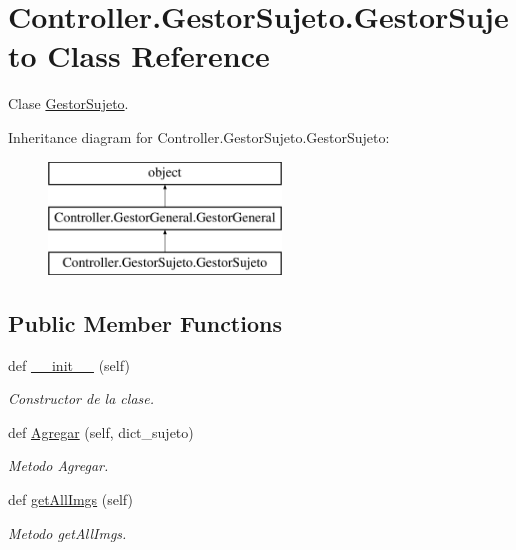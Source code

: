 \hypertarget{class_controller_1_1_gestor_sujeto_1_1_gestor_sujeto}{}\section{Controller.\+Gestor\+Sujeto.\+Gestor\+Sujeto Class Reference}
\label{class_controller_1_1_gestor_sujeto_1_1_gestor_sujeto}


Clase \hyperlink{class_controller_1_1_gestor_sujeto_1_1_gestor_sujeto}{Gestor\+Sujeto}.  


Inheritance diagram for Controller.\+Gestor\+Sujeto.\+Gestor\+Sujeto\+:\begin{figure}[H]
\begin{center}
\leavevmode
\includegraphics[height=3.000000cm]{class_controller_1_1_gestor_sujeto_1_1_gestor_sujeto}
\end{center}
\end{figure}
\subsection*{Public Member Functions}
\begin{DoxyCompactItemize}
\item 
def \hyperlink{class_controller_1_1_gestor_sujeto_1_1_gestor_sujeto_af03120d2a26ad27cf43979b059065818}{\+\_\+\+\_\+init\+\_\+\+\_\+} (self)
\begin{DoxyCompactList}\small\item\em Constructor de la clase. \end{DoxyCompactList}\item 
def \hyperlink{class_controller_1_1_gestor_sujeto_1_1_gestor_sujeto_a1c67d8cc16d790e739b12e48b150d05d}{Agregar} (self, dict\+\_\+sujeto)
\begin{DoxyCompactList}\small\item\em Metodo Agregar. \end{DoxyCompactList}\item 
def \hyperlink{class_controller_1_1_gestor_sujeto_1_1_gestor_sujeto_af5cd0c01af8ad7d3da5f72ac4d9a93cf}{get\+All\+Imgs} (self)
\begin{DoxyCompactList}\small\item\em Metodo get\+All\+Imgs. \end{DoxyCompactList}\end{DoxyCompactItemize}
